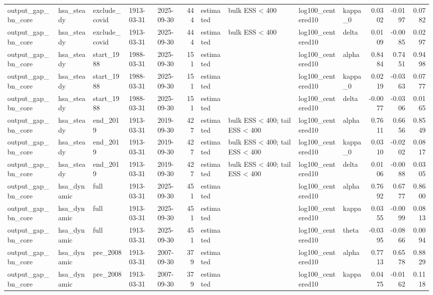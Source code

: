 \begin{tabular}{lllllrllllrrr}
output\_gap\_bn\_core & hsa\_steady & exclude\_covid & 1913-03-31 & 2025-09-30 & 444 & estimated & bulk ESS < 400 & log100\_centered10 & kappa\_0 & 0.0302 & -0.0197 & 0.0782 \\
output\_gap\_bn\_core & hsa\_steady & exclude\_covid & 1913-03-31 & 2025-09-30 & 444 & estimated & bulk ESS < 400 & log100\_centered10 & delta & 0.0109 & -0.0085 & 0.0297 \\
output\_gap\_bn\_core & hsa\_steady & start\_1988 & 1988-03-31 & 2025-09-30 & 151 & estimated &  & log100\_centered10 & alpha & 0.8484 & 0.7451 & 0.9498 \\
output\_gap\_bn\_core & hsa\_steady & start\_1988 & 1988-03-31 & 2025-09-30 & 151 & estimated &  & log100\_centered10 & kappa\_0 & 0.0219 & -0.0363 & 0.0777 \\
output\_gap\_bn\_core & hsa\_steady & start\_1988 & 1988-03-31 & 2025-09-30 & 151 & estimated &  & log100\_centered10 & delta & -0.0077 & -0.0306 & 0.0165 \\
output\_gap\_bn\_core & hsa\_steady & end\_2019 & 1913-03-31 & 2019-09-30 & 427 & estimated & bulk ESS < 400; tail ESS < 400 & log100\_centered10 & alpha & 0.7611 & 0.6656 & 0.8549 \\
output\_gap\_bn\_core & hsa\_steady & end\_2019 & 1913-03-31 & 2019-09-30 & 427 & estimated & bulk ESS < 400; tail ESS < 400 & log100\_centered10 & kappa\_0 & 0.0310 & -0.0202 & 0.0817 \\
output\_gap\_bn\_core & hsa\_steady & end\_2019 & 1913-03-31 & 2019-09-30 & 427 & estimated & bulk ESS < 400; tail ESS < 400 & log100\_centered10 & delta & 0.0106 & -0.0088 & 0.0305 \\
output\_gap\_bn\_core & hsa\_dynamic & full & 1913-03-31 & 2025-09-30 & 451 & estimated &  & log100\_centered10 & alpha & 0.7692 & 0.6777 & 0.8600 \\
output\_gap\_bn\_core & hsa\_dynamic & full & 1913-03-31 & 2025-09-30 & 451 & estimated &  & log100\_centered10 & kappa & 0.0355 & -0.0099 & 0.0813 \\
output\_gap\_bn\_core & hsa\_dynamic & full & 1913-03-31 & 2025-09-30 & 451 & estimated &  & log100\_centered10 & theta & -0.0395 & -0.0866 & 0.0094 \\
output\_gap\_bn\_core & hsa\_dynamic & pre\_2008 & 1913-03-31 & 2007-09-30 & 379 & estimated &  & log100\_centered10 & alpha & 0.7713 & 0.6578 & 0.8829 \\
output\_gap\_bn\_core & hsa\_dynamic & pre\_2008 & 1913-03-31 & 2007-09-30 & 379 & estimated &  & log100\_centered10 & kappa & 0.0475 & -0.0162 & 0.1118 \\

\end{tabular}
